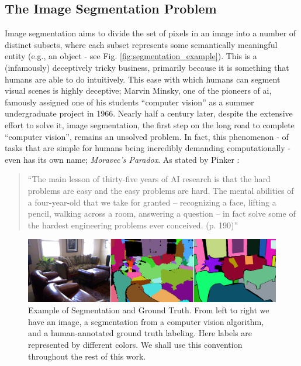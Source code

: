 \subsection{The Image Segmentation Problem}
Image segmentation aims to divide the set of pixels in an image into a number of distinct subsets, where each subset represents some semantically meaningful entity (e.g., an object - see Fig. \ref{fig:segmentation_example}). This is a (infamously) deceptively tricky business, primarily because it is something that humans are able to do intuitively. This ease with which humans can segment visual scenes is highly deceptive; Marvin Minsky, one of the pioneers of \gls{ai}, famously assigned one of his students ``computer vision'' as a summer undergraduate project in 1966. Nearly half a century later, despite the extensive effort to solve it, image segmentation, the first step on the long road to complete ``computer vision'', remains an unsolved problem.  In fact, this phenomenon - of tasks that are simple for humans being incredibly demanding computationally - even has its own name; \emph{Moravec's Paradox}. As stated by Pinker \cite{Pinker_Language}:

\begin{quote}
``The main lesson of thirty-five years of AI research is that the hard problems are easy and the easy problems are hard. The mental abilities of a four-year-old that we take for granted – recognizing a face, lifting a pencil, walking across a room, answering a question – in fact solve some of the hardest engineering problems ever conceived. (p. 190)''
\end{quote}


\begin{figure}
\label{fig:SegmentationExample}
\centering
\includegraphics[width=\linewidth]{figures/Introduction/segmentation_GT_example.png}
\caption[Example of Segmentation and Ground Truth]{Example of Segmentation and Ground Truth. From left to right we have an image, a segmentation from a computer vision algorithm, and a human-annotated ground truth labeling. Here labels are represented by different colors. We shall use this convention throughout the rest of this work.}
\end{figure}

